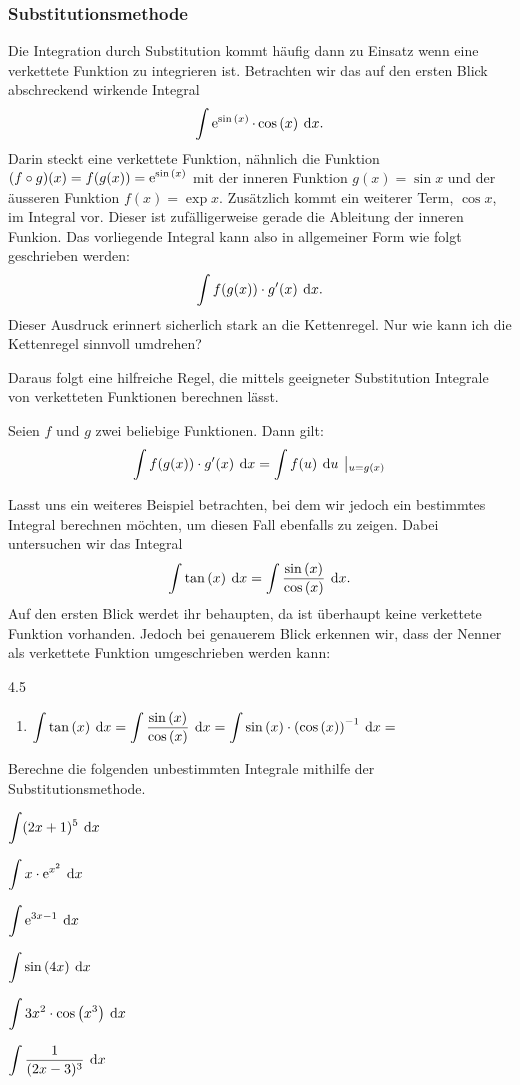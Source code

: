 \subsubsection{Substitutionsmethode}
	\begin{beispiel}
		Die Integration durch Substitution kommt häufig dann zu Einsatz wenn eine verkettete Funktion zu integrieren ist. Betrachten wir das auf den ersten Blick abschreckend wirkende Integral \[\int\exp{\sin{x}}\*\cos{x}\d{x}.\] Darin steckt eine verkettete Funktion, nähnlich die Funktion $\ds(f\circ g)(x)=f(g(x))=\exp{\sin{x}}$ mit der inneren Funktion $g(x)=\sin{x}$ und der äusseren Funktion $f(x)=\exp{x}$. Zusätzlich kommt ein weiterer Term, $\cos{x}$, im Integral vor. Dieser ist zufälligerweise gerade die Ableitung der inneren Funkion. Das vorliegende Integral kann also in allgemeiner Form wie folgt geschrieben werden: \[\int f(g(x))\cdot g'(x)\:\operatorname{d}\!{x}.\] Dieser Ausdruck erinnert sicherlich stark an die Kettenregel. Nur wie kann ich die Kettenregel sinnvoll umdrehen?\\[5pt]
	\end{beispiel}
	Daraus folgt eine hilfreiche Regel, die mittels geeigneter Substitution Integrale von verketteten Funktionen berechnen lässt.
	\begin{satz}[Substitutionsmethode]
		Seien $f$ und $g$ zwei beliebige Funktionen. Dann gilt: \[\int f(g(x))\cdot g'(x)\:\operatorname{d}\!{x}=\int f(u)\:\operatorname{d}\!{u}\:\left\vert_{u=g(x)}\right.\]
	\end{satz}
	\begin{beispiel}
		Lasst uns ein weiteres Beispiel betrachten, bei dem wir jedoch ein bestimmtes Integral berechnen möchten, um diesen Fall ebenfalls zu zeigen. Dabei untersuchen wir das Integral \[\ds\int \tan{x}\d{x}=\int\frac{\sin{x}}{\cos{x}}\d{x}.\] Auf den ersten Blick werdet ihr behaupten, da ist überhaupt keine verkettete Funktion vorhanden. Jedoch bei genauerem Blick erkennen wir, dass der Nenner als verkettete Funktion umgeschrieben werden kann:
		\begin{gridspace}{4.5}
			\vspace{-2.5mm}
			\begin{enumerate}[label=\ ,leftmargin=0mm]
				\item $\ds\int\tan{x}\d{x}=\int\frac{\sin{x}}{\cos{x}}\d{x}=\int\sin{x}\*\left(\cos{x}\right)^{-1}\d{x}=$
			\end{enumerate}
		\end{gridspace}
	\end{beispiel}
	\begin{aufgabe}
		Berechne die folgenden unbestimmten Integrale mithilfe der Substitutionsmethode.
		\begin{enumcols}[2]
			\item $\displaystyle\int (2x+1)^5\:\operatorname{d}\!{x}$
			\item $\displaystyle\int x\cdot\operatorname{\operatorname{e}}^{x^2}\:\operatorname{d}\!{x}$
			\item $\displaystyle\int \operatorname{\operatorname{e}}^{3x-1}\:\operatorname{d}\!{x}$
			\item $\ds\int \sin{4x}\d{x}$
			\item $\ds\int 3x^2\*\cos{x^3}\d{x}$
			\item $\displaystyle\int \frac{1}{(2x-3)^3}\:\operatorname{d}\!{x}$
		\end{enumcols}
	\end{aufgabe}
